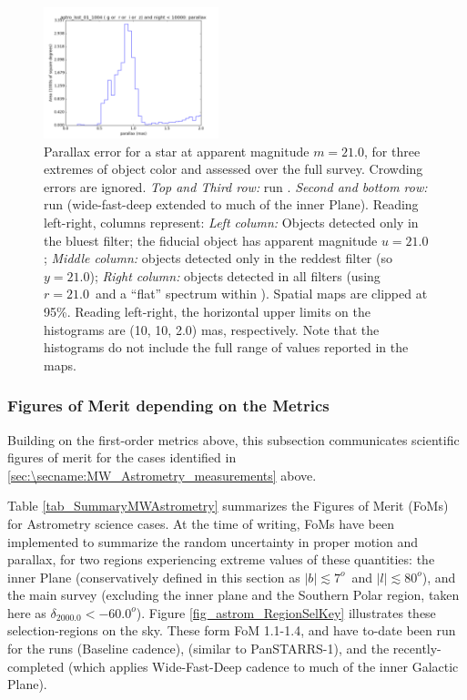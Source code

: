 \begin{figure}[ht]
\begin{center}
  \includegraphics[width=2.0in]{./figs/milkyway/astromPanels/MW_Astrom_paError_wfdPlane_10y_hst.png}
  \end{center}
  \caption{Parallax error for a star at apparent magnitude $m=21.0$, for three extremes of object color and assessed over the full survey. Crowding errors are ignored. {\it Top and Third row:} \OpSim run . {\it Second and bottom row:} \OpSim run  (wide-fast-deep extended to much of the inner Plane). Reading left-right, columns represent: {\it Left column:} Objects detected only in the bluest filter; the fiducial object has apparent magnitude $u=21.0$; {\it Middle column:} objects detected only in the reddest filter (so $y = 21.0$); {\it Right column:} objects detected in all filters (using $r=21.0$~and a ``flat'' spectrum within \MAF). Spatial maps are clipped at 95\%. Reading left-right, the horizontal upper limits on the histograms are (10, 10, 2.0) mas, respectively. Note that the histograms do not include the full range of values reported in the maps.}
  \label{fig_astrom_ByFilter_paError}
\end{figure}

\subsubsection{Figures of Merit depending on the Metrics}

Building on the first-order metrics above, this subsection communicates scientific figures of merit for the cases identified in \autoref{sec:\secname:MW_Astrometry_measurements} above.

Table \ref{tab_SummaryMWAstrometry} summarizes the Figures of Merit
(FoMs) for Astrometry science cases. At the time of writing, FoMs have
been implemented to summarize the random uncertainty in proper motion
and parallax, for two regions experiencing extreme values of these
quantities: the inner Plane (conservatively defined in this section as
$|b| \lesssim 7^o$~and $|l| \lesssim 80^o$), and the main survey
(excluding the inner plane and the Southern Polar region, taken
here as $\delta_{2000.0} < -60.0^o$). Figure
\ref{fig_astrom_RegionSelKey} illustrates these selection-regions on
the sky. These form FoM 1.1-1.4, and have to-date been run for the
\OpSim runs  (Baseline cadence),
 (similar to PanSTARRS-1), and the
recently-completed  (which applies
Wide-Fast-Deep cadence to much of the inner Galactic Plane). 

